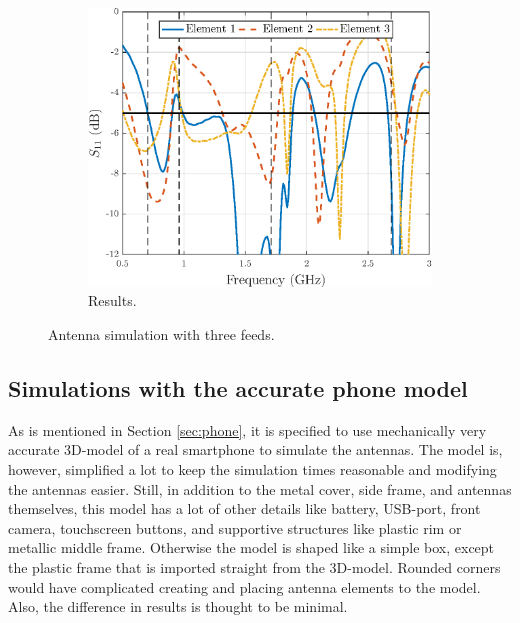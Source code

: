 \begin{figure}[H]
    \centering
    \ContinuedFloat 
    \begin{subfigure}[b]{0.49\textwidth}
        \includegraphics[width=\textwidth]{img/concept_3feeds.eps}
        \caption{Results.}
        \label{fig:concept_3feeds_res}
    \end{subfigure}
    \caption{Antenna simulation with three feeds.}
    \label{fig:concept_3feeds}
\end{figure}



\subsection{Simulations with the accurate phone model}
\label{sec:sim_realistic}
As is mentioned in Section \ref{sec:phone}, it is specified to use mechanically very accurate 3D-model of a real smartphone to simulate the antennas. The model is, however, simplified a lot to keep the simulation times reasonable and modifying the antennas easier. Still, in addition to the metal cover, side frame, and antennas themselves, this model has a lot of other details like battery, USB-port, front camera, touchscreen buttons, and supportive structures like plastic rim or metallic middle frame. Otherwise the model is shaped like a simple box, except the plastic frame that is imported straight from the 3D-model. Rounded corners would have complicated creating and placing antenna elements to the model. Also, the difference in results is thought to be minimal. 

